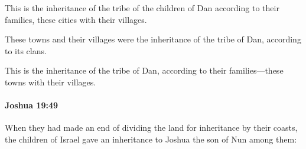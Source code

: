 			\begin{versebox}
					\item[BHS] 
					\item[ASV] This is the inheritance of the tribe of the children of Dan according to their families, these cities with their villages.
					\item[NIV] These towns and their villages were the inheritance of the tribe of Dan, according to its clans.
					\item[NRSV] This is the inheritance of the tribe of Dan, according to their families—these towns with their villages.
			\end{versebox}

		\paragraph{Joshua 19:49} %
			\label{JOSHUA-19-49}

			When they had made an end of dividing the land for inheritance by their coasts, the children of Israel gave an inheritance to Joshua the son of Nun among them:

